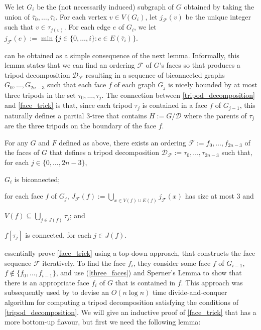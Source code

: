 \documentclass{patmorin}
\begin{document}
We let $G_i$ be the (not necessarily induced) subgraph of $G$ obtained by taking the union of $\overline{\tau}_0,\ldots,\overline{\tau}_i$.  For each vertex $v\in V(G_i)$, let $j_\mathcal{F}(v)$ be the unique integer such that $v\in \tau_{j(v)}$. For each edge $e$ of $G_i$, we let $j_\mathcal{F}(e):=\min\{j\in\{0,\ldots,i\}:e\in E(\overline{\tau}_i)\}$.

 can be obtained as a simple consequence of the next lemma. Informally, this lemma states that we can find an ordering $\mathcal{F}$ of $G$'s faces so that produces a tripod decomposition $\mathcal{D}_\mathcal{F}$ resulting in a sequence of biconnected graphs $G_0,\ldots,G_{2n-3}$ such that each face $f$ of each graph $G_j$ is nicely bounded by at most three tripods in the set $\tau_0,\ldots,\tau_j$.  The connection between \cref{tripod_decomposition} and \cref{face_trick} is that, since each tripod $\tau_j$ is contained in a face $f$ of $G_{j-1}$, this naturally defines a partial $3$-tree that contains $H:=G/\mathcal{D}$ where the parents of $\tau_j$ are the three tripods on the boundary of the face $f$.

\begin{lem}\label{face_trick}
  For any $G$ and $F$ defined as above, there exists an ordering $\mathcal{F}:=f_0,\ldots,f_{2n-3}$ of the faces of $G$ that defines a tripod decomposition $\mathcal{D}_\mathcal{F}:=\tau_0,\ldots,\tau_{2n-3}$ such that, for each $j\in\{0,\ldots,2n-3\}$,
  \begin{compactenum}[(i)]
    \item \label{biconnected} $G_i$ is biconnected;
    \item \label{three_faces} for each face $f$ of $G_j$, $J_\mathcal{F}(f):=\bigcup_{x\in V(f)\cup E(f)} j_\mathcal{F}(x)$ has size at most $3$ and
    \begin{compactenum}[(a)]
      \item $V(f)\subseteq \bigcup_{j\in J(f)} \tau_{j}$; and
      \item $f[\tau_{j}]$ is connected, for each $j\in J(f)$.
    \end{compactenum}
  \end{compactenum}
\end{lem}

\citet{dujmovic.joret.ea:planar} essentially prove \cref{face_trick} using a top-down approach, that constructs the face sequence $\mathcal{F}$ iteratively.  To find the face $f_i$, they consider some face $f$ of $G_{i-1}$, $f\not\in\{f_0,\ldots,f_{i-1}\}$, and use (\ref{three_faces}) and Sperner's Lemma to show that there is an appropriate face $f_i$ of $G$ that is contained in $f$.  This approach was subsequently used by \citet{morin:fast} to devise an $O(n\log n)$ time divide-and-conquer algorithm for computing a tripod decomposition satisfying the conditions of \cref{tripod_decomposition}.  We will give an inductive proof of \cref{face_trick} that has a more bottom-up flavour, but first we need the following lemma:
\end{document}

